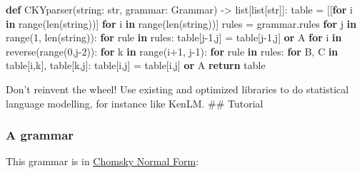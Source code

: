 \documentclass[
  11pt,
  british,
]{article}
\newenvironment{Shaded}{}{}
\newcommand{\BuiltInTok}[1]{#1}
\newcommand{\ControlFlowTok}[1]{\textcolor[rgb]{0.00,0.44,0.13}{\textbf{#1}}}
\newcommand{\DecValTok}[1]{\textcolor[rgb]{0.25,0.63,0.44}{#1}}
\newcommand{\KeywordTok}[1]{\textcolor[rgb]{0.00,0.44,0.13}{\textbf{#1}}}
\newcommand{\NormalTok}[1]{#1}
\newcommand{\OperatorTok}[1]{\textcolor[rgb]{0.40,0.40,0.40}{#1}}
\newcommand{\StringTok}[1]{\textcolor[rgb]{0.25,0.44,0.63}{#1}}
\begin{document}
\begin{Shaded}
\begin{Highlighting}[]
\KeywordTok{def}\NormalTok{ CKYparser(string: }\BuiltInTok{str}\NormalTok{, grammar: }\StringTok{\textquotesingle{}Grammar\textquotesingle{}}\NormalTok{) }\OperatorTok{{-}\textgreater{}} \BuiltInTok{list}\NormalTok{[}\BuiltInTok{list}\NormalTok{[}\BuiltInTok{str}\NormalTok{]]:}
\NormalTok{    table }\OperatorTok{=}\NormalTok{ [[}\ControlFlowTok{for}\NormalTok{ i }\KeywordTok{in} \BuiltInTok{range}\NormalTok{(}\BuiltInTok{len}\NormalTok{(string))] }\ControlFlowTok{for}\NormalTok{ i }\KeywordTok{in} \BuiltInTok{range}\NormalTok{(}\BuiltInTok{len}\NormalTok{(string))]}
\NormalTok{    rules }\OperatorTok{=}\NormalTok{ grammar.rules}
    \ControlFlowTok{for}\NormalTok{ j }\KeywordTok{in} \BuiltInTok{range}\NormalTok{(}\DecValTok{1}\NormalTok{, }\BuiltInTok{len}\NormalTok{(string)):}
        \ControlFlowTok{for}\NormalTok{ rule }\KeywordTok{in}\NormalTok{ rules:}
\NormalTok{            table[j}\OperatorTok{{-}}\DecValTok{1}\NormalTok{,j] }\OperatorTok{=}\NormalTok{ table[j}\OperatorTok{{-}}\DecValTok{1}\NormalTok{,j] }\KeywordTok{or}\NormalTok{ A}
        \ControlFlowTok{for}\NormalTok{ i }\KeywordTok{in}\NormalTok{ reverse(}\BuiltInTok{range}\NormalTok{(}\DecValTok{0}\NormalTok{,j}\OperatorTok{{-}}\DecValTok{2}\NormalTok{)):}
            \ControlFlowTok{for}\NormalTok{ k }\KeywordTok{in} \BuiltInTok{range}\NormalTok{(i}\OperatorTok{+}\DecValTok{1}\NormalTok{, j}\OperatorTok{{-}}\DecValTok{1}\NormalTok{):}
                \ControlFlowTok{for}\NormalTok{ rule }\KeywordTok{in}\NormalTok{ rules:}
                    \ControlFlowTok{for}\NormalTok{ B, C }\KeywordTok{in}\NormalTok{ table[i,k], table[k,j]:}
\NormalTok{                        table[i,j] }\OperatorTok{=}\NormalTok{ table[i,j] }\KeywordTok{or}\NormalTok{ A}
    \ControlFlowTok{return}\NormalTok{ table}
\end{Highlighting}
\end{Shaded}

Don't reinvent the wheel! Use existing and optimized libraries to do
statistical language modelling, for instance like KenLM. \#\# Tutorial

\hypertarget{a-grammar}{%
\subsubsection{A grammar}\label{a-grammar}}

This grammar is in \href{Chomsky\%20Normal\%20Form.md}{Chomsky Normal
Form}:
\end{document}
